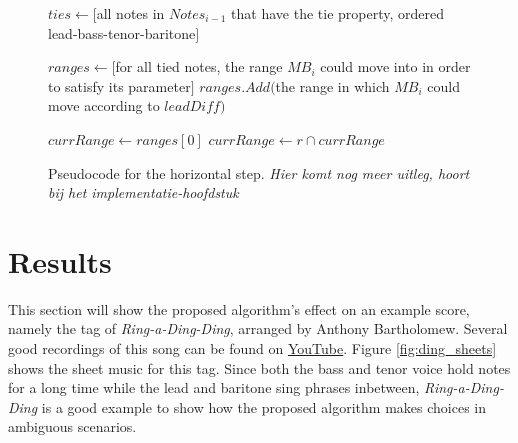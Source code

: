 \documentclass[a4paper]{article}
\begin{document}
\begin{figure}
	\begin{algorithmic}[1]
		\State $\mathit{ties} \gets [$all notes in $\mathit{Notes}_{i-1}$ that have the tie property, ordered lead-bass-tenor-baritone$]$
		
		\State $\mathit{ranges} \gets [$for all tied notes, the range $\mathit{MB}_i$ could move into in order to satisfy its parameter$]$
		\State $\mathit{ranges.Add}($the range in which $\mathit{MB}_i$ could move according to $\mathit{leadDiff})$
		
		\State{}
		\Else
		\State $\mathit{currRange} \gets \mathit{ranges}[0]$
		\State $\mathit{currRange} \gets r \cap \mathit{currRange}$
		\State {}
		\EndIf
		\EndFor
		
		\State{}
		\EndIf
		\EndProcedure
	\end{algorithmic}
	\caption{Pseudocode for the horizontal step. \textit{\color{red}Hier komt nog meer uitleg, hoort bij het implementatie-hoofdstuk}}
	\label{fig:pseudocodeH}
\end{figure}

\section{Results}
\label{results}

This section will show the proposed algorithm's effect on an example score, namely the tag of \textit{Ring-a-Ding-Ding}, arranged by Anthony Bartholomew. Several good recordings of this song can be found on \href{https://www.youtube.com/watch?v=G40I5JDtfjI&t=147s}{YouTube}. Figure \ref{fig:ding_sheets} shows the sheet music for this tag. Since both the bass and tenor voice hold notes for a long time while the lead and baritone sing phrases inbetween, \textit{Ring-a-Ding-Ding} is a good example to show how the proposed algorithm makes choices in ambiguous scenarios.
\end{document}
